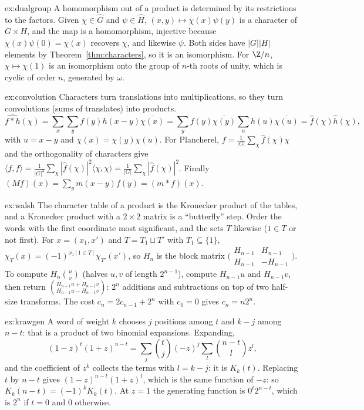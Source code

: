 \begin{solution}{ex:dualgroup}
\idea A homomorphism out of a product is determined by its restrictions to the factors.
\writeup Given $\chi\in\widehat G$ and $\psi\in\widehat H$, $(x,y)\mapsto\chi(x)\psi(y)$ is a character of $G\times H$, and the map is a
homomorphism, injective because $\chi(x)\psi(0)=\chi(x)$ recovers $\chi$, and likewise $\psi$. Both sides have $|G||H|$ elements by
Theorem~\ref{thm:characters}, so it is an isomorphism. For $\Z/n$, $\chi\mapsto\chi(1)$ is an isomorphism onto the group of $n$-th roots of
unity, which is cyclic of order $n$, generated by $\omega$.
\end{solution}

\begin{solution}{ex:convolution}
\idea Characters turn translations into multiplications, so they turn convolutions (sums of translates) into products.
\writeup
\[
\widehat{f*h}(\chi)=\sum_x\sum_yf(y)h(x-y)\overline{\chi(x)}=\sum_yf(y)\overline{\chi(y)}\sum_uh(u)\overline{\chi(u)}=\hat f(\chi)\hat h(\chi),
\]
with $u=x-y$ and $\chi(x)=\chi(y)\chi(u)$. For Plancherel, $f=\frac1{|G|}\sum_\chi\hat f(\chi)\chi$ and the orthogonality of characters
give $\langle f,f\rangle=\frac1{|G|^2}\sum_\chi|\hat f(\chi)|^2\langle\chi,\chi\rangle=\frac1{|G|}\sum_\chi|\hat f(\chi)|^2$. Finally
$(Mf)(x)=\sum_ym(x-y)f(y)=(m*f)(x)$.
\end{solution}

\begin{solution}{ex:walsh}
\idea The character table of a product is the Kronecker product of the tables, and a Kronecker product with a $2\times2$ matrix
is a ``butterfly'' step.
\writeup Order the words with the first coordinate most significant, and the sets $T$ likewise ($1\in T$ or not first). For
$x=(x_1,x')$ and $T=T_1\sqcup T'$ with $T_1\subseteq\{1\}$, $\chi_T(x)=(-1)^{x_1[1\in T]}\chi_{T'}(x')$, so $H_n$ is the block matrix
$\bigl(\begin{smallmatrix}H_{n-1}&H_{n-1}\\H_{n-1}&-H_{n-1}\end{smallmatrix}\bigr)$. To compute $H_n\binom uv$ (halves $u,v$ of length
$2^{n-1}$), compute $H_{n-1}u$ and $H_{n-1}v$, then return $\binom{H_{n-1}u+H_{n-1}v}{H_{n-1}u-H_{n-1}v}$: $2^n$ additions and subtractions
on top of two half-size transforms. The cost $c_n=2c_{n-1}+2^n$ with $c_0=0$ gives $c_n=n2^n$.
\end{solution}

\begin{solution}{ex:krawgen}
\idea A word of weight $k$ chooses $j$ positions among $t$ and $k-j$ among $n-t$: that is a product of two binomial expansions.
\writeup Expanding,
\[
(1-z)^t(1+z)^{n-t}=\sum_j\binom tj(-z)^j\sum_l\binom{n-t}lz^l,
\]
and the coefficient of $z^k$ collects the terms with $l=k-j$: it is $K_k(t)$.
Replacing $t$ by $n-t$ gives $(1-z)^{n-t}(1+z)^t$, which is the same function of $-z$: so $K_k(n-t)=(-1)^kK_k(t)$. At $z=1$ the
generating function is $0^t2^{n-t}$, which is $2^n$ if $t=0$ and $0$ otherwise.
\end{solution}

